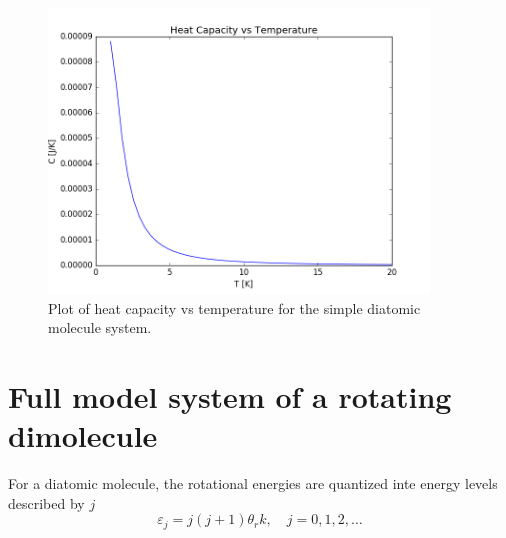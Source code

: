 \documentclass[10pt,a4paper]{amsart}
\begin{document}
\begin{figure}[H]
	\includegraphics[width=0.9\textwidth]{figures/heatcapsimple.png}
	\caption{Plot of heat capacity vs temperature for the simple 			diatomic molecule system.}
	\label{fig:heatcap1}
\end{figure}

\section{Full model system of a rotating dimolecule}

For a diatomic molecule, the rotational energies are quantized inte energy levels described by $j$
\begin{equation}
\varepsilon_j=j(j+1)\theta_r k, \quad j=0,1,2,\dots
\end{equation}
\end{document}
